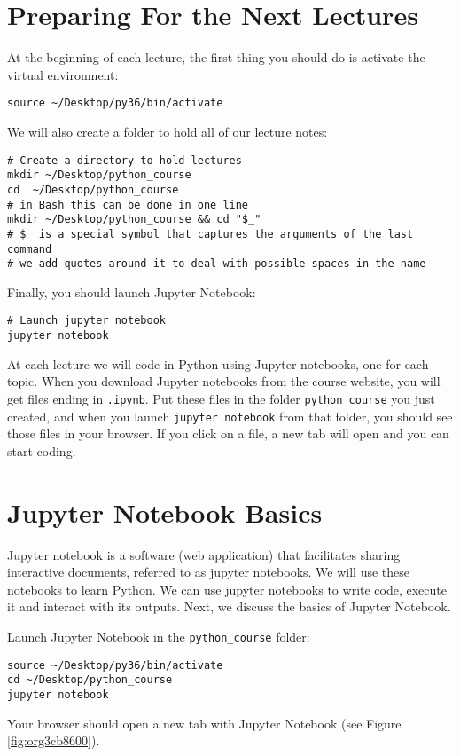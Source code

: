 \documentclass[12pt, a4paper]{article}
\begin{document}
\section*{Preparing For the Next Lectures}
\label{sec:orgfff56d0}
At the beginning of each lecture, the first thing you should do is activate the virtual environment:
\lstset{language=bash,label= ,caption= ,captionpos=b,firstnumber=1,numbers=left,style=bash}
\begin{lstlisting}
source ~/Desktop/py36/bin/activate
\end{lstlisting}
We will also create a folder to hold all of our lecture notes:
\lstset{language=bash,label= ,caption= ,captionpos=b,firstnumber=1,numbers=left,style=bash}
\begin{lstlisting}
# Create a directory to hold lectures
mkdir ~/Desktop/python_course
cd  ~/Desktop/python_course
# in Bash this can be done in one line
mkdir ~/Desktop/python_course && cd "$_"
# $_ is a special symbol that captures the arguments of the last command
# we add quotes around it to deal with possible spaces in the name
\end{lstlisting}
Finally, you should launch Jupyter Notebook:
\lstset{language=bash,label= ,caption= ,captionpos=b,firstnumber=1,numbers=left,style=bash}
\begin{lstlisting}
# Launch jupyter notebook
jupyter notebook
\end{lstlisting}
At each lecture we will code in Python using Jupyter notebooks, one for each topic.
When you download Jupyter notebooks from the course website, you will get files ending in \texttt{.ipynb}.
Put these files in the folder \texttt{python\_course} you just created, and when you launch \texttt{jupyter notebook} from that folder, you should see those files in your browser.
If you click on a file, a new tab will open and you can start coding.
\section*{Jupyter Notebook Basics}
\label{sec:org0c3e5c9}
Jupyter notebook is a software (web application) that facilitates sharing interactive documents, referred to as jupyter notebooks.
We will use these notebooks to learn Python.
We can use jupyter notebooks to write code, execute it and interact with its outputs.
Next, we discuss the basics of Jupyter Notebook.

Launch Jupyter Notebook in the \texttt{python\_course} folder:
\lstset{language=bash,label= ,caption= ,captionpos=b,firstnumber=1,numbers=left,style=bash}
\begin{lstlisting}
source ~/Desktop/py36/bin/activate
cd ~/Desktop/python_course
jupyter notebook
\end{lstlisting}
Your browser should open a new tab with Jupyter Notebook (see Figure \ref{fig:org3cb8600}).
\end{document}
